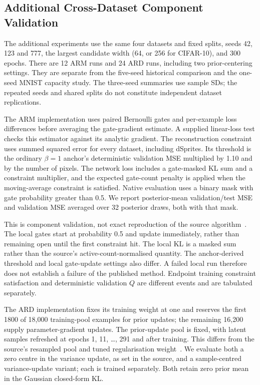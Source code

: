 \subsection{Additional Cross-Dataset Component Validation}\label{sec:gpuvalidation}
The additional experiments use the same four datasets and fixed splits,
seeds 42, 123 and 777, the largest candidate width (64, or 256 for
CIFAR-10), and 300 epochs. There are 12 ARM runs and 24 ARD runs,
including two prior-centering settings. They are separate from the
five-seed historical comparison and the one-seed MNIST capacity study.
The three-seed summaries use sample SDs; the repeated seeds and shared
splits do not constitute independent dataset replications.

The ARM implementation uses paired Bernoulli gates and per-example
loss differences before averaging the gate-gradient estimate. A supplied
linear-loss test checks this estimator against its analytic gradient.
The reconstruction constraint uses summed squared error for every
dataset, including dSprites. Its threshold is the ordinary $\beta=1$
anchor's deterministic validation MSE multiplied by 1.10 and by the
number of pixels. The network loss includes a gate-masked KL sum and
a constraint multiplier, and the expected gate-count penalty is applied
when the moving-average constraint is satisfied. Native evaluation
uses a binary mask with gate probability greater than 0.5. We report
posterior-mean validation/test MSE and validation MSE averaged over
32 posterior draws, both with that mask.

This is component validation, not exact reproduction of the source
algorithm~\cite{deboom2020geco}. The local gates start at probability
0.5 and update immediately, rather than remaining open until the first
constraint hit. The local KL is a masked sum rather than the source's
active-count-normalised quantity. The anchor-derived threshold and
local gate-update settings also differ. A failed local run therefore
does not establish a failure of the published method. Endpoint training
constraint satisfaction and deterministic validation $Q$ are different
events and are tabulated separately.

The ARD implementation fixes its training weight at one and reserves
the first 1800 of 18,000 training-pool examples for prior updates; the
remaining 16,200 supply parameter-gradient updates. The prior-update
pool is fixed, with latent samples refreshed at epochs 1, 11, \ldots,
291 and after training. This differs from the source's resampled pool
and tuned regularisation weight~\cite{saha2025ardvae}. We evaluate both
a zero centre in the variance update, as set in the source, and a
sample-centred variance-update variant; each is trained separately.
Both retain zero prior mean in the Gaussian closed-form KL.

